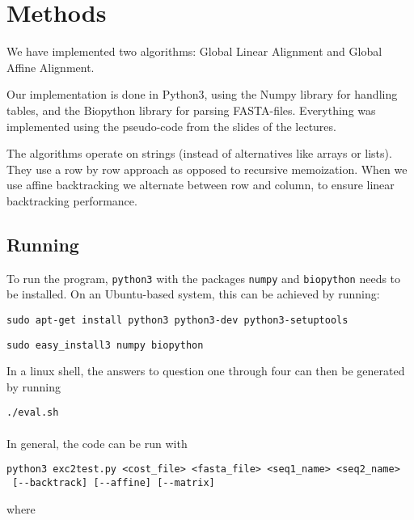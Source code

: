 \section{Methods}

We have implemented two algorithms: Global Linear Alignment and Global Affine Alignment. 

Our implementation is done in Python3, using the Numpy library for handling tables, and the Biopython library for parsing FASTA-files.
Everything was implemented using the pseudo-code from the slides of the lectures. 

The algorithms operate on strings (instead of alternatives like arrays or lists). They use a row by row approach as opposed to recursive memoization. 
When we use affine backtracking we alternate between row and column, to ensure linear backtracking performance. 

\subsection{Running}

To run the program, \verb|python3| with the packages \verb|numpy| and
\verb|biopython| needs to be installed. On an Ubuntu-based system, this can
be achieved by running:

\verb|sudo apt-get install python3 python3-dev python3-setuptools|

\verb|sudo easy_install3 numpy biopython|

In a linux shell, the answers to question one through four can then be
generated by running

\verb|./eval.sh|

\paragraph{}
In general, the code can be run with

\begin{verbatim}
python3 exc2test.py <cost_file> <fasta_file> <seq1_name> <seq2_name>
 [--backtrack] [--affine] [--matrix]
\end{verbatim}

where

